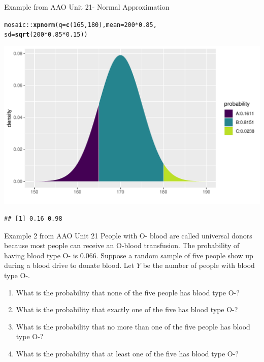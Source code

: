 \documentclass[10pt]{beamer}\usepackage[]{graphicx}\usepackage[]{color}
\makeatletter
\def\maxwidth{ %
  \ifdim\Gin@nat@width>\linewidth
    \linewidth
  \else
    \Gin@nat@width
  \fi
}
\newcommand{\hlnum}[1]{\textcolor[rgb]{0.686,0.059,0.569}{#1}}%
\newcommand{\hlopt}[1]{\textcolor[rgb]{0,0,0}{#1}}%
\newcommand{\hlstd}[1]{\textcolor[rgb]{0.345,0.345,0.345}{#1}}%
\newcommand{\hlkwc}[1]{\textcolor[rgb]{0.333,0.667,0.333}{#1}}%
\newcommand{\hlkwd}[1]{\textcolor[rgb]{0.737,0.353,0.396}{\textbf{#1}}}%
\newenvironment{kframe}{%
 \def\at@end@of@kframe{}%
 \ifinner\ifhmode%
  \def\at@end@of@kframe{\end{minipage}}%
  \begin{minipage}{\columnwidth}%
 \fi\fi%
 \def\FrameCommand##1{\hskip\@totalleftmargin \hskip-\fboxsep
 \colorbox{shadecolor}{##1}\hskip-\fboxsep
     \hskip-\linewidth \hskip-\@totalleftmargin \hskip\columnwidth}%
 \MakeFramed {\advance\hsize-\width
   \@totalleftmargin\z@ \linewidth\hsize
   \@setminipage}}%
 {\par\unskip\endMakeFramed%
 \at@end@of@kframe}
\newenvironment{knitrout}{}{} %
\makeatother
\begin{document}
\begin{frame}[fragile]{Example from AAO Unit 21- Normal Approximation}
	
\begin{knitrout}\tiny
{}\color{fgcolor}\begin{kframe}
\begin{alltt}
\hlstd{mosaic}\hlopt{::}\hlkwd{xpnorm}\hlstd{(}\hlkwc{q} \hlstd{=} \hlkwd{c}\hlstd{(}\hlnum{165}\hlstd{,}\hlnum{180}\hlstd{),} \hlkwc{mean} \hlstd{=} \hlnum{200} \hlopt{*} \hlnum{0.85}\hlstd{,}
\hlkwc{sd} \hlstd{=} \hlkwd{sqrt}\hlstd{(}\hlnum{200}\hlopt{*}\hlnum{0.85}\hlopt{*}\hlnum{0.15}\hlstd{))}
\end{alltt}
\end{kframe}

{\centering \includegraphics[width=\maxwidth]{figure/unnamed-chunk-8-1} 

}


\begin{kframe}\begin{verbatim}
## [1] 0.16 0.98
\end{verbatim}
\end{kframe}
\end{knitrout}
\end{frame}



\begin{frame}{Example 2 from AAO Unit 21}
	People with O- blood are called universal donors because most people can receive an O-blood transfusion. The probability of having blood type O- is 0.066. Suppose a random sample of five people show up during a blood drive to donate blood. Let $Y$ be the number of people with blood type O-.
	
	\begin{enumerate}
		\item What is the probability that none of the five people has blood type O-?
		\item What is the probability that exactly one of the five has blood type O-?
		\item What is the probability that no more than one of the five people has blood type O-?
		\item What is the probability that at least one of the five has blood type O-?
	\end{enumerate}
\end{frame}
\end{document}
